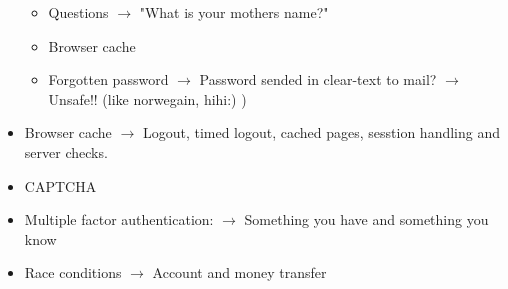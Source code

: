 \begin{itemize}
			\begin{itemize}
				\item Questions $\rightarrow$ "What is your mothers name?"
				\item Browser cache
				\item Forgotten password $\rightarrow$ Password sended in clear-text to mail? $\rightarrow$ Unsafe!! (like norwegain, hihi:) )
			\end{itemize}
		\item Browser cache $\rightarrow$ Logout, timed logout, cached pages, sesstion handling and server checks. 
		\item CAPTCHA
		\item Multiple factor authentication: $\rightarrow$ Something you have and something you know
		\item Race conditions $\rightarrow$ Account and money transfer
	\end{itemize}

\clearpage
